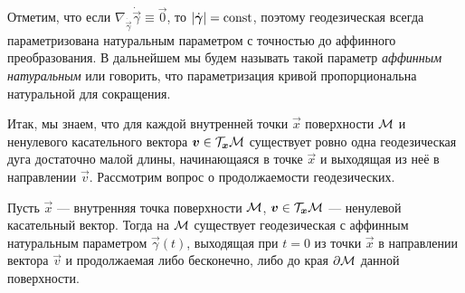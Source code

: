 Отметим, что если $\nabla_{\dot{\vec{\gamma}}}\dot{\vec{\gamma}} \equiv \vec{0}$, то $\left\lvert\dot{\boldsymbol{\gamma}}\right\rvert = \mathrm{const}$, поэтому геодезическая всегда параметризована натуральным параметром с точностью до аффинного преобразования. В дальнейшем мы будем называть такой параметр \textit{аффинным натуральным} или говорить, что параметризация кривой пропорциональна натуральной для сокращения.

Итак, мы знаем, что для каждой внутренней точки $\vec{x}$ поверхности $\mathcal{M}$ и ненулевого касательного вектора $\boldsymbol{v} \in \mathcal{T}_{\boldsymbol{x}}\mathcal{M}$ существует ровно одна геодезическая дуга достаточно малой длины, начинающаяся в точке $\vec{x}$ и выходящая из неё в направлении $\vec{v}$. Рассмотрим вопрос о продолжаемости геодезических.

\begin{theorem}
	Пусть $\vec{x}$ --- внутренняя точка поверхности $\mathcal{M}$, $\boldsymbol{v} \in \mathcal{T}_{\boldsymbol{x}}\mathcal{M}$ --- ненулевой касательный вектор. Тогда на $\mathcal{M}$ существует геодезическая с аффинным натуральным параметром $\vec{\gamma}(t)$, выходящая при $t = 0$ из точки $\vec{x}$ в направлении вектора $\vec{v}$ и продолжаемая либо бесконечно, либо до края $\partial\mathcal{M}$ данной поверхности.
\end{theorem}

